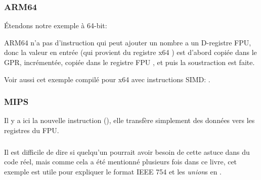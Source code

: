 \subsubsection{ARM64}

Étendons notre exemple à 64-bit:



ARM64 n'a pas d'instruction qui peut ajouter un nombre a un D-registre FPU, donc
la valeur en entrée (qui provient du registre x64 ) est d'abord copiée dans
le \ac{GPR}, incrémentée, copiée dans le registre FPU , et puis la soustraction
est faite.



Voir aussi cet exemple compilé pour x64 avec instructions SIMD: .

\subsubsection{MIPS}


Il y a ici la nouvelle instruction  (), elle transfère
simplement des données vers les registres du FPU.



\subsubsection{\Conclusion}

Il est difficile de dire si quelqu'un pourrait avoir besoin de cette astuce dans
du code réel, mais comme cela a été mentionné plusieurs fois dans ce livre, cet exemple
est utile pour expliquer le format IEEE 754 et les \emph{union}s en \CCpp.
